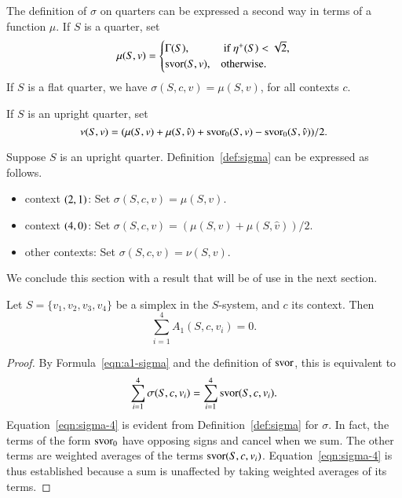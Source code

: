 The definition of $\sigma$ on quarters can be expressed a second
way in terms of a function $\mu$.  If $S$ is a quarter, set
    \begin{equation}
    \mu(S,v)=\begin{cases}
    \Gamma(S),&  \text{ if }\eta^+(S)<\sqrt2,\\
    \operatorname{svor}(S,v),& \hbox{otherwise.}\end{cases}
    \label{eqn:3.8}
    \end{equation}
If $S$ is a flat quarter, we have $\sigma(S,c,v)=\mu(S,v)$, for
all contexts $c$.

\begin{definition} If $S$ is an upright quarter, set
$$\nu(S,v)=(\mu(S,v)+\mu(S,\hat v) + \operatorname{svor}_0(S,v)-\operatorname{svor}_0(S,\hat v))/2.$$
\end{definition}


Suppose $S$ is an upright quarter.
Definition~\ref{def:sigma} can be expressed as follows.


\begin{itemize}
 \item context $\relax(2,1)$:  Set $\sigma(S,c,v)=\mu(S,v)$.
 \item context
    $\relax(4,0)$:  Set $\sigma(S,c,v)=(\mu(S,v)+\mu(S,\hat v))/2$.
 \item other contexts:
 Set $\sigma(S,c,v)=\nu(S,v)$.
\end{itemize}





We conclude this section with a result that will be of use in the
next section.

\begin{lemma}\label{lemma:A1-cancel}
Let $S=\{v_1,v_2,v_3,v_4\}$ be a simplex in the $S$-system,  and $c$
its context.   Then
   $$\sum_{i=1}^4 A_1(S,c,v_i)=0.$$
\end{lemma}

\begin{proof}
   By Formula~\ref{eqn:a1-sigma} and the definition of $\operatorname{svor}$,
this is equivalent to
      \begin{equation}
      \sum_{i=1}^4 \sigma(S,c,v_i) = \sum_{i=1}^4
      \operatorname{svor}(S,c,v_i).
      \label{eqn:sigma-4}
      \end{equation}
Equation~\ref{eqn:sigma-4} is evident from
Definition~\ref{def:sigma} for $\sigma$.  In fact, the terms of the
form $\operatorname{svor}_0$ have opposing signs and cancel when we sum. The other
terms are weighted averages of the terms $\operatorname{svor}(S,c,v_i)$.
Equation~\ref{eqn:sigma-4} is thus established because a sum is
unaffected by taking weighted averages of its terms.
\end{proof}


